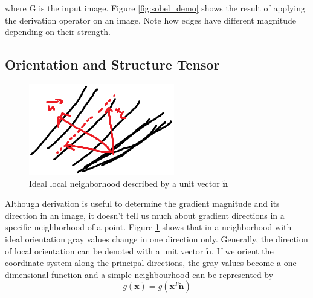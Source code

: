 
		where G is the input image. Figure \ref{fig:sobel_demo} shows the result of applying the derivation operator on an image. Note how edges have different magnitude depending on their strength. 
		
		
		\subsection{Orientation and Structure Tensor}
		\begin{figure} %
			\centering
			\includegraphics[scale=1]{images/structure_tensor_intro.png}
			\caption{Ideal local neighborhood described by a unit vector $\tilde{\mathbf{n}}$}
			\label{fig:struct_tensor_intro}
		\end{figure}
		Although derivation is useful to determine the gradient magnitude and its direction in an image, it doesn't tell us much about gradient directions in a specific neighborhood of a point. Figure \ref{fig:struct_tensor_intro} shows that in a neighborhood with ideal orientation gray values change in one direction only. Generally, the direction of local orientation can be denoted with a unit vector $\tilde{\mathbf{n}}$. If we orient the coordinate system along the principal directions, the gray values become a one dimensional function and a simple neighbourhood can be represented by
		\begin{equation}
			g(\mathbf{x}) = g(\mathbf{x}^T \tilde{\mathbf{n}})
		\end{equation}


